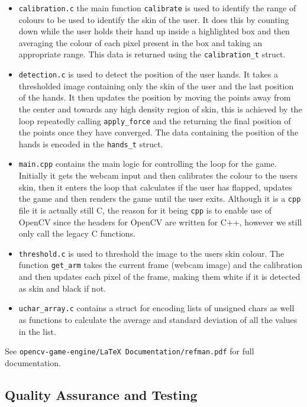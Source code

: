\documentclass[10pt]{article}
\begin{document}
\begin{itemize}
\item \texttt{calibration.c} the main function \texttt{calibrate} is used to identify the range of colours to be used to identify the skin of the user. It does this by counting down while the user holds their hand up inside a highlighted box and then averaging the colour of each pixel present in the box and taking an appropriate range. This data is returned using the \texttt{calibration\_t} struct.
\item \texttt{detection.c} is used to detect the position of the user hands. It takes a thresholded image containing only the skin of the user and the last position of the hands. It then updates the position by moving the points away from the center and towards any high density region of skin, this is achieved by the loop repeatedly calling \texttt{apply\_force} and the returning the final position of the points once they have converged. The data containing the position of the hands is encoded in the \texttt{hands\_t} struct.
\item \texttt{main.cpp} contains the main logic for controlling the loop for the game. Initially it gets the webcam input and then calibrates the colour to the users skin, then it enters the loop that calculates if the user has flapped, updates the game and then renders the game until the user exits. Although it is a \texttt{cpp} file it is actually still C, the reason for it being \texttt{cpp} is to enable use of OpenCV since the headers for OpenCV are written for C++, however we still only call the legacy C functions.
\item \texttt{threshold.c} is used to threshold the image to the users skin colour. The function \texttt{get\_arm} takes the current frame (webcam image) and the calibration and then updates each pixel of the frame, making them white if it is detected as skin and black if not.
\item \texttt{uchar\_array.c} contains a struct for encoding lists of unsigned chars as well as functions to calculate the average and standard deviation of all the values in the list.
\end{itemize}

See \texttt{opencv-game-engine/LaTeX Documentation/refman.pdf} for full documentation.

\subsection{Quality Assurance and Testing}
\end{document}
